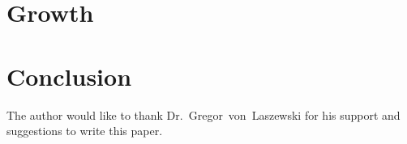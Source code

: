 \section{Growth}

\section{Conclusion}

\begin{acks}

  The author would like to thank Dr.~Gregor~von~Laszewski for his
  support and suggestions to write this paper.

\end{acks}


 
